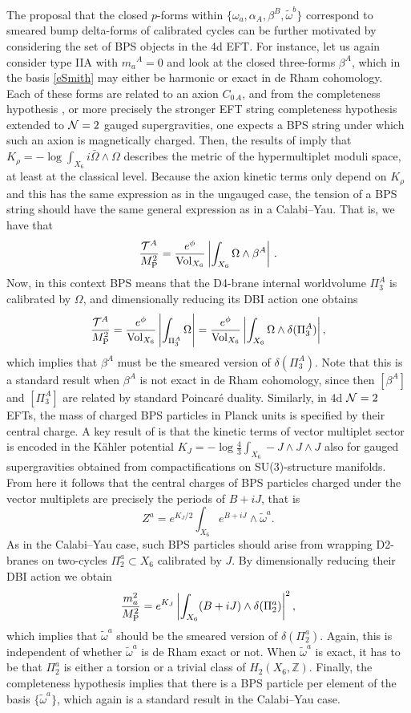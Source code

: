 \documentclass[11pt]{article}
\def\a {\alpha}
\def\b {\beta}
\def\CN {{\cal N}}
\def\be{\begin{equation}}
\def\ee{\end{equation}}
\def\om{\omega}
\def\Om{\Omega}
\newcommand{\IZ}{\mathbb{Z}}
\begin{document}
The proposal that the closed $p$-forms within $\{\om_a, \a_A, \b^B, \tilde{\om}^b\}$ correspond to smeared bump delta-forms of calibrated cycles can be further motivated by considering the set of BPS objects in the 4d EFT. For instance, let us again consider type IIA with $m_a{}^A =0$ and look at the closed three-forms $\b^A$, which in the basis \eqref{eSmith} may either be harmonic or exact in de Rham cohomology. Each of these forms are related to an axion $C_{0\, A}$, and from the completeness hypothesis \cite{Polchinski:2003bq}, or more precisely the stronger EFT string completeness hypothesis \cite{Lanza:2021udy} extended to $\CN=2$ gauged supergravities, one expects a BPS string under which such an axion is magnetically charged. Then, the results of \cite{Grana:2005ny,Kashani-Poor:2006ofe} imply that $K_\rho = - \log \int_{X_6} i \bar{\Om} \wedge \Om$  describes the metric of the hypermultiplet moduli space, at least at the classical level. Because the axion kinetic terms only depend on $K_\rho$ and this has the same expression as in the ungauged case, the tension of a BPS string should have the same general expression as in a Calabi--Yau. That is, we have that
\be
\frac{{\cal T}^A}{M_{\rm P}^2} = \frac{e^{\phi}}{{\rm Vol}_{X_6}} \left| \int_{X_6} \Om \wedge \beta^A \right| \, .
\ee
Now, in this context BPS means that the D4-brane internal worldvolume $\Pi_3^A$ is calibrated by $\Omega$, and dimensionally reducing its DBI action one obtains
\be
\frac{{\cal T}^A}{M_{\rm P}^2} =  \frac{e^{\phi}}{{\rm Vol}_{X_6}}  \left| \int_{\Pi_3^A}  \Om \right| =  \frac{e^{\phi}}{{\rm Vol}_{X_6}}  \left| \int_{X_6}  \Om \wedge \delta(\Pi_3^A) \right| ,
\ee
which implies that $\b^A$ must be the smeared version of $\delta(\Pi_3^A)$. Note that this is a standard result when $\b^A$ is not exact in de Rham cohomology, since then $[\b^A]$ and $[\Pi_3^A]$ are related by standard Poincar\'e duality. Similarly, in 4d $\CN=2$ EFTs, the mass of charged BPS particles in Planck units is specified by their central charge. A key result of \cite{Grana:2005ny,Kashani-Poor:2006ofe} is that the kinetic terms of vector multiplet sector is encoded in the K\"ahler potential $K_J = - \log \frac{4}{3}\int_{X_6} - J \wedge J \wedge J$ also for gauged supergravities obtained from compactifications on SU(3)-structure manifolds. From here it follows that the central charges of BPS particles charged under the vector multiplets are precisely the periods of $B+iJ$, that is
\be
Z^a = e^{K_J/2} \int_{X_6} e^{B+iJ} \wedge \tilde{\om}^a .
\ee
As in the Calabi--Yau case, such BPS particles should arise from wrapping D2-branes on two-cycles $\Pi_2^a \subset X_6$  calibrated by $J$. By dimensionally reducing their DBI action we obtain
\be
\frac{m_a^2}{M_{\rm P}^2} = e^{K_J} \left| \int_{X_6} (B+i J)\wedge \delta (\Pi_2^a) \right|^2  ,
\ee
which implies that $\tilde{\om}^a$ should be the smeared version of $\delta(\Pi_2^a)$. Again, this is independent of whether $\tilde{\om}^a$ is de Rham exact or not. When $\tilde{\om}^a$ is exact, it has to be that $\Pi_2^a$ is either a torsion or a trivial class of $H_2(X_6, \IZ)$. Finally, the completeness hypothesis implies that there is a BPS particle per element of the basis $\{\tilde{\om}^a\}$, which again is a standard result in the Calabi--Yau case. 
\end{document}
